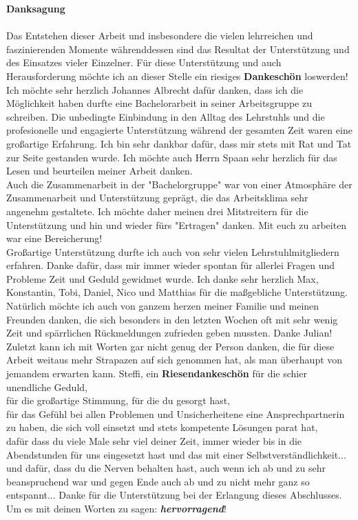 {\huge \textbf{Danksagung}}\\
\\
Das Entstehen dieser Arbeit und insbesondere die vielen lehrreichen und faszinierenden Momente währenddessen sind das Resultat der Unterstützung und des Einsatzes vieler Einzelner. Für diese Unterstützung und auch Herausforderung möchte ich an dieser Stelle ein riesiges \textbf{Dankeschön} loswerden!\\
Ich möchte sehr herzlich Johannes Albrecht dafür danken, dass ich die Möglichkeit haben durfte eine Bachelorarbeit in seiner Arbeitsgruppe zu schreiben. Die unbedingte Einbindung in den Alltag des Lehrstuhls und die profesionelle und engagierte Unterstützung während der gesamten Zeit waren eine großartige Erfahrung. Ich bin sehr dankbar dafür, dass mir stets mit Rat und Tat zur Seite gestanden wurde. Ich möchte auch Herrn Spaan sehr herzlich für das Lesen und beurteilen meiner Arbeit danken.\\
Auch die Zusammenarbeit in der "Bachelorgruppe" war von einer Atmosphäre der Zusammenarbeit und Unterstützung geprägt, die das Arbeitsklima sehr angenehm gestaltete. Ich möchte daher meinen drei Mitstreitern für die Unterstützung und hin und wieder fürs "Ertragen" danken. Mit euch zu arbeiten war eine Bereicherung!\\
Großartige Unterstützung durfte ich auch von sehr vielen Lehrstuhlmitgliedern erfahren. Danke dafür, dass mir immer wieder spontan für allerlei Fragen und Probleme Zeit und Geduld gewidmet wurde. Ich danke sehr herzlich Max, Konstantin, Tobi, Daniel, Nico und Matthias für die maßgebliche Unterstützung.\\
Natürlich möchte ich auch von ganzem herzen meiner Familie und meinen Freunden danken, die sich besonders in den letzten Wochen oft mit sehr wenig Zeit und spärrlichen Rückmeldungen zufrieden geben mussten. Danke Julian!\\
Zuletzt kann ich mit Worten gar nicht genug der Person danken, die für diese Arbeit weitaus mehr Strapazen auf sich genommen hat, als man überhaupt von jemandem erwarten kann. Steffi, ein \textbf{Riesendankeschön} für die schier unendliche Geduld,\\
\;für die großartige Stimmung, für die du gesorgt hast,\\
\;für das Gefühl bei allen Problemen und Unsicherheitene eine Ansprechpartnerin zu haben, die sich voll einsetzt und stets kompetente Lösungen parat hat,\\
\;dafür dass du viele Male sehr viel deiner Zeit, immer wieder bis in die Abendstunden für uns eingesetzt hast und das mit einer Selbstverständlichkeit...\\
\;und dafür, dass du die Nerven behalten hast, auch wenn ich ab und zu sehr beanspruchend war und gegen Ende auch ab und zu nicht mehr ganz so entspannt... Danke für die Unterstützung bei der Erlangung dieses Abschlusses. Um es mit deinen Worten zu sagen: \textbf{\textit{hervorragend}}!
